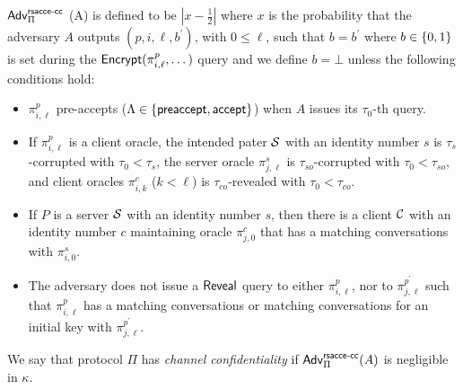 \begin{definition} \label{def:rsacce-cc}
 $\mathsf{Adv}^{\mathsf{rsacce\textsc{-} cc}}_{\Pi}$ (A) is defined to be
 $|x - \frac{1}{2}|$ where $x$ is the probability that
 the adversary $A$ outputs $(p, i, \ell, b^{\prime})$,
 with $0\leq \ell$, such that $b = b^{\prime}$ where
 $b \in \{0,1\}$ is set during the
 $\mathsf{Encrypt}(\pi^p_{i,\ell},\dots)$ query and we define
 $b=\bot$ unless the following conditions hold:
 \begin{itemize}
  \item{$\pi^p_{i,\ell}$ pre-accepts
  ($\Lambda \in \{\mathsf{preaccept}, \mathsf{accept} \}$) when $A$
  issues its $\tau_0$-th query.}

  \item{If $\pi^p_{i,\ell}$ is a client oracle, the
  intended pater $\mathcal{S}$ with an identity number $s$ is $\tau_s$-corrupted
  with $\tau_0 < \tau_s$, the server oracle $\pi^s_{j,\ell}$ is
  $\tau_{so}$-corrupted with $\tau_0 < \tau_{so}$, and
  client oracles $\pi^c_{i,k}$
  ($k < \ell$) is $\tau_{co}$-revealed with $\tau_0 < \tau_{co}$.}

  \item{If $P$ is a server $\mathcal{S}$ with an identity number $s$, then there
  is a client $\mathcal{C}$ with an identity number $c$ maintaining oracle
  $\pi^c_{j,0}$ that has a matching conversations with $\pi^s_{i,0}$.}

  \item{The adversary does not issue a $\mathsf{Reveal}$ query
  to either $\pi^p_{i,\ell}$, nor to
  $\pi^{p^{\prime}}_{j,\ell}$ such that $\pi^p_{i,\ell}$
  has a matching conversations or matching conversations for an initial key with
  $\pi^{p^{\prime}}_{j,\ell}$.}
 \end{itemize}
 We say that protocol $\Pi$ has
 \textit{channel confidentiality} if
 $\mathsf{Adv}^{\mathsf{rsacce\textsc{-} cc}}_{\Pi}(A)$ is negligible in $\kappa$.
\end{definition}

